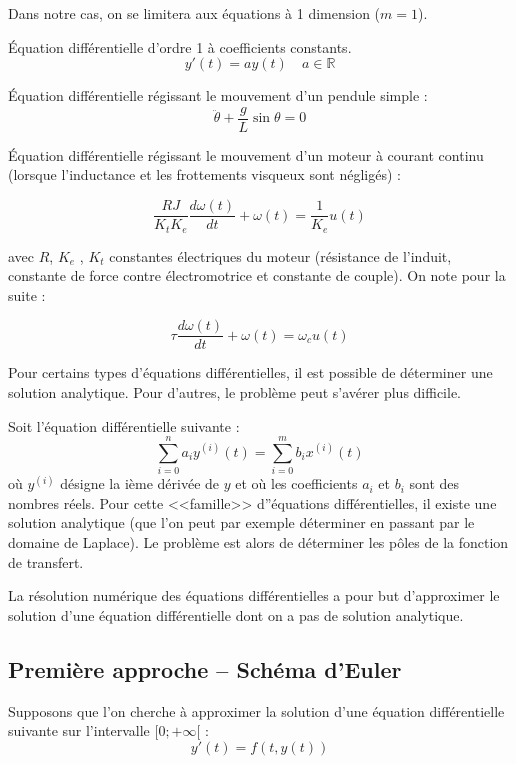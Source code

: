 \documentclass[10pt]{article}
\begin{document}
\begin{rem}
Dans notre cas, on se limitera aux équations à 1 dimension ($m=1$).
\end{rem}
\begin{exemple}
Équation différentielle d'ordre 1 à coefficients constants. 
$$
y'(t)=ay(t)\quad a\in \mathbb{R}
$$

Équation différentielle régissant le mouvement d'un pendule simple :
$$
\ddot{\theta} + \dfrac{g}{L}\sin\theta=0
$$

Équation différentielle régissant le mouvement d'un moteur à courant continu (lorsque l'inductance et les frottements visqueux sont négligés) :

$$
\dfrac{RJ}{K_t K_e} \dfrac{d\omega(t)}{dt} + \omega(t)= \dfrac{1}{K_e} u(t)
$$

avec $R$, $K_e$ , $K_t$ constantes électriques du moteur (résistance de l’induit,
constante de force contre électromotrice et constante de couple).
On note pour la suite : 

$$
\tau \dfrac{d\omega(t)}{dt} + \omega(t)= \omega_c u(t)
$$

\end{exemple}

Pour certains types d'équations différentielles, il est possible de déterminer une solution analytique. Pour d'autres, le problème peut s'avérer plus difficile. 
\begin{exemple}
Soit l'équation différentielle suivante :
$$
\sum\limits_{i=0}^n a_i y^{(i)}(t) = \sum\limits_{i=0}^m b_i x^{(i)}(t)
$$
où $y^{(i)}$ désigne la ième dérivée de $y$ et où les coefficients $a_i$ et $b_i$ sont des nombres réels. Pour cette <<famille>> d''équations différentielles, il existe une solution analytique (que l'on peut par exemple déterminer en passant par le domaine de Laplace). Le problème est alors de déterminer les pôles de la fonction de transfert.
\end{exemple}

La résolution numérique des équations différentielles a pour but d'approximer le solution d'une équation différentielle dont on a pas de solution analytique.

\subsection{Première approche -- Schéma d'Euler}

Supposons que l'on cherche à approximer la solution d'une équation différentielle suivante sur l'intervalle $[0;+\infty[$ :
$$
y'(t)=f(t,y(t))
$$ 
\end{document}
